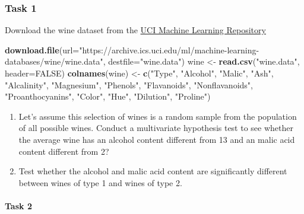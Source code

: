 \documentclass[]{book}
\newenvironment{Shaded}{\begin{snugshade}}{\end{snugshade}}
\newcommand{\DataTypeTok}[1]{\textcolor[rgb]{0.13,0.29,0.53}{#1}}
\newcommand{\KeywordTok}[1]{\textcolor[rgb]{0.13,0.29,0.53}{\textbf{#1}}}
\newcommand{\NormalTok}[1]{#1}
\newcommand{\OtherTok}[1]{\textcolor[rgb]{0.56,0.35,0.01}{#1}}
\newcommand{\StringTok}[1]{\textcolor[rgb]{0.31,0.60,0.02}{#1}}
\let\oldparagraph\paragraph
\renewcommand{\paragraph}[1]{\oldparagraph{#1}\mbox{}}
\theoremstyle{definition}
\theoremstyle{definition}
\theoremstyle{definition}
\theoremstyle{remark}
\begin{document}
\hypertarget{task-1-2}{%
\subsubsection*{Task 1}\label{task-1-2}}

Download the wine dataset from the \href{https://archive.ics.uci.edu/ml/datasets/wine}{UCI Machine Learning Repository}

\begin{Shaded}
\begin{Highlighting}[]
\KeywordTok{download.file}\NormalTok{(}\DataTypeTok{url=}\StringTok{"https://archive.ics.uci.edu/ml/machine-learning-databases/wine/wine.data"}\NormalTok{, }\DataTypeTok{destfile=}\StringTok{"wine.data"}\NormalTok{)}
\NormalTok{wine <-}\StringTok{ }\KeywordTok{read.csv}\NormalTok{(}\StringTok{"wine.data"}\NormalTok{, }\DataTypeTok{header=}\OtherTok{FALSE}\NormalTok{)}
\KeywordTok{colnames}\NormalTok{(wine) <-}\StringTok{ }\KeywordTok{c}\NormalTok{(}\StringTok{"Type"}\NormalTok{, }\StringTok{"Alcohol"}\NormalTok{, }\StringTok{"Malic"}\NormalTok{,}
\StringTok{"Ash"}\NormalTok{,}
\StringTok{"Alcalinity"}\NormalTok{,}
\StringTok{"Magnesium"}\NormalTok{,}
\StringTok{"Phenols"}\NormalTok{,}
\StringTok{"Flavanoids"}\NormalTok{,}
\StringTok{"Nonflavanoids"}\NormalTok{,}
\StringTok{"Proanthocyanins"}\NormalTok{,}
\StringTok{"Color"}\NormalTok{,}
\StringTok{"Hue"}\NormalTok{,}
\StringTok{"Dilution"}\NormalTok{,}
\StringTok{"Proline"}\NormalTok{)}
\end{Highlighting}
\end{Shaded}

\begin{enumerate}
\def\labelenumi{\roman{enumi}.}
\item
  Let's assume this selection of wines is a random sample from the population of all possible wines. Conduct a multivariate hypothesis test to see whether the average wine has an alcohol content different from 13 and an malic acid content different from 2?
\item
  Test whether the alcohol and malic acid content are significantly different between wines of type 1 and wines of type 2.
\end{enumerate}

\hypertarget{task-2-2}{%
\paragraph{Task 2}\label{task-2-2}}
\end{document}
